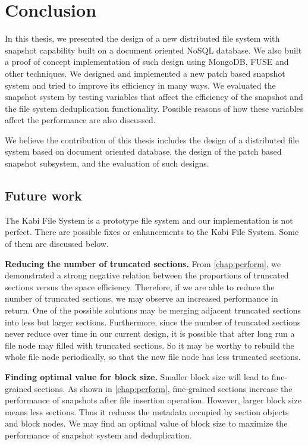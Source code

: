 \chapter{Conclusion}
\label{chap:conclusion}

    In this thesis, we presented the design of a new distributed file system with snapshot capability built on a document oriented NoSQL database. We also built a proof of concept implementation of such design using MongoDB, FUSE and other techniques. We designed and implemented a new patch based snapshot system and tried to improve its efficiency in many ways. We evaluated the snapshot system by testing variables that affect the efficiency of the snapshot and the file system deduplication functionality. Possible reasons of how these variables affect the performance are also discussed.

    We believe the contribution of this thesis includes the design of a distributed file system based on document oriented database, the design of the patch based snapshot subsystem, and the evaluation of such designs.

\section{Future work}

    The Kabi File System is a prototype file system and our implementation is not perfect. There are possible fixes or enhancements to the Kabi File System. Some of them are discussed below.    

    \textbf{Reducing the number of truncated sections.} From \cref{chap:perform}, we demonstrated a strong negative relation between the proportions of truncated sections versus the space efficiency. Therefore, if we are able to reduce the number of truncated sections, we may observe an increased performance in return. One of the possible solutions may be merging adjacent truncated sections into less but larger sections. Furthermore, since the number of truncated sections never reduce over time in our current design, it is possible that after long run a file node may filled with truncated sections. So it may be worthy to rebuild the whole file node periodically, so that the new file node has less truncated sections.
    
    \textbf{Finding optimal value for block size.} Smaller block size will lead to fine-grained sections. As shown in \cref{chap:perform}, fine-grained sections increase the performance of snapshots after file insertion operation. However, larger block size means less sections. Thus it reduces the metadata occupied by section objects and block nodes. We may find an optimal value of block size to maximize the performance of snapshot system and deduplication.

